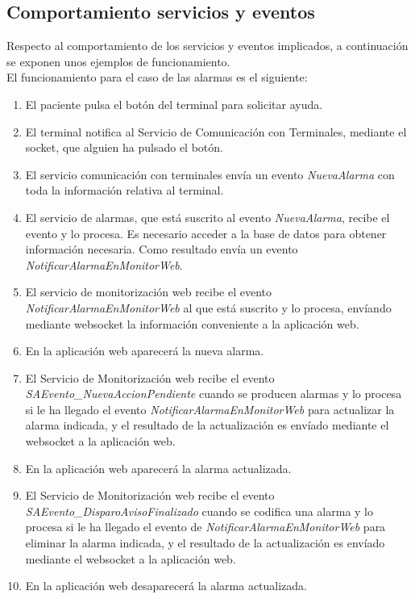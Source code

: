 


\subsection{Comportamiento servicios y eventos}
\label{subsection-comportamiento}
Respecto al comportamiento de los servicios y eventos implicados, a continuación se exponen unos ejemplos de funcionamiento.\\

El funcionamiento para el caso de las alarmas es el siguiente:
\begin{enumerate}
	\item El paciente pulsa el botón del terminal para solicitar ayuda.	
	\item El terminal notifica al Servicio de Comunicación con Terminales, mediante el socket, que alguien ha pulsado el botón.
	\item El servicio comunicación con terminales envía un evento \textit{NuevaAlarma} con toda la información relativa al terminal.
	\item El servicio de alarmas, que está suscrito al evento \textit{NuevaAlarma}, recibe el evento y lo procesa. Es necesario acceder a la base de datos para obtener información necesaria. Como resultado envía un evento \textit{NotificarAlarmaEnMonitorWeb}.
	\item El servicio de monitorización web recibe el evento \textit{NotificarAlarmaEnMonitorWeb} al que está suscrito y lo procesa, envíando mediante websocket la información conveniente a la aplicación web.
	\item En la aplicación web aparecerá la nueva alarma.
	\item El Servicio de Monitorización web recibe el evento \textit{SAEvento\_NuevaAccionPendiente} cuando se producen alarmas y lo procesa si le ha llegado el evento \textit{NotificarAlarmaEnMonitorWeb} para actualizar la alarma indicada, y el resultado de la actualización es envíado mediante el websocket a la aplicación web.
	\item En la aplicación web aparecerá la alarma actualizada.
	\item El Servicio de Monitorización web recibe el evento \textit{SAEvento\_DisparoAvisoFinalizado} cuando se codifica una alarma y lo procesa si le ha llegado el evento de \textit{NotificarAlarmaEnMonitorWeb} para eliminar la alarma indicada, y el resultado de la actualización es envíado mediante el websocket a la aplicación web.
	\item En la aplicación web desaparecerá la alarma actualizada.
\end{enumerate}


